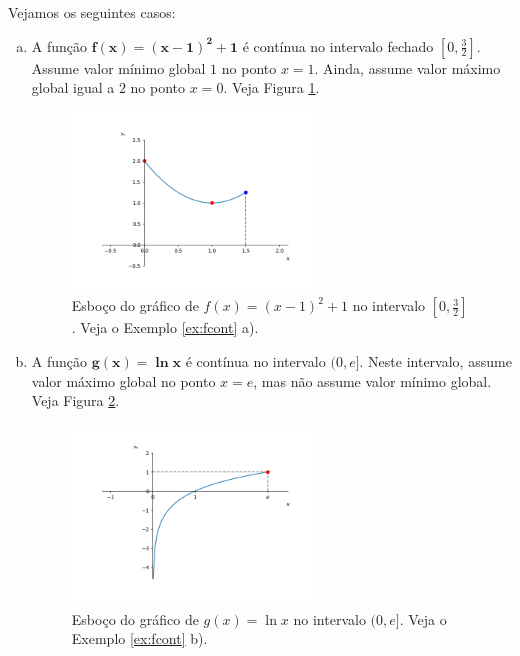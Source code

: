\cleardoublepage\documentclass[../main.tex]{subfiles}
\begin{document}
\begin{ex}\label{ex:fcont}
  Vejamos os seguintes casos:
  \begin{enumerate}[a)]
  \item  A função $\boldsymbol{f(x) = (x-1)^2+1}$ é contínua no intervalo fechado $\displaystyle \left[0, \frac{3}{2}\right]$. Assume valor mínimo global $1$ no ponto $x=1$. Ainda, assume valor máximo global igual a $2$ no ponto $x=0$. Veja Figura \ref{fig:ex_fcont_f}.
  \begin{figure}[!htb]
    \centering
    \includegraphics[width=0.6\textwidth]{./fig_apl_deriv/fig_f}
    \caption{Esboço do gráfico de $f(x) = (x-1)^2+1$ no intervalo $\displaystyle\left[0, \frac{3}{2}\right]$. Veja o Exemplo \ref{ex:fcont} a).}
    \label{fig:ex_fcont_f}
  \end{figure}
\item A função $\boldsymbol{g(x) = \ln x}$ é contínua no intervalo $(0, e]$. Neste intervalo, assume valor máximo global no ponto $x=e$, mas não assume valor mínimo global. Veja Figura \ref{fig:ex_fcont_g}.
  \begin{figure}[!htb]
    \centering
    \includegraphics[width=0.6\textwidth]{./fig_apl_deriv/fig_g}
    \caption{Esboço do gráfico de $g(x) = \ln x$ no intervalo $(0,e]$. Veja o Exemplo \ref{ex:fcont} b).}
    \label{fig:ex_fcont_g}
  \end{figure}
  

\end{enumerate}
\end{ex}
\end{document}
